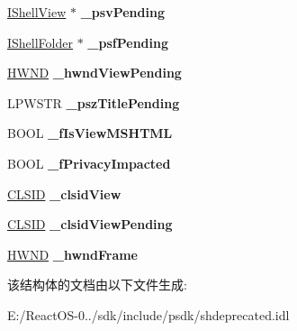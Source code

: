 \begin{DoxyCompactItemize}
\hyperlink{interface_i_shell_view}{I\+Shell\+View} $\ast$ {\bfseries \+\_\+psv\+Pending}
\item 
\mbox{\label{structbasebrowserdataxp_a1b22fd6ab70423c8d0876e6c79c5e8fc}} 
\hyperlink{interface_i_shell_folder}{I\+Shell\+Folder} $\ast$ {\bfseries \+\_\+psf\+Pending}
\item 
\mbox{\label{structbasebrowserdataxp_a0a948ff8259c5c95799078a7fcee6c1a}} 
\hyperlink{interfacevoid}{H\+W\+ND} {\bfseries \+\_\+hwnd\+View\+Pending}
\item 
\mbox{\label{structbasebrowserdataxp_a1cda3a3ee969129390b4b844dac370f8}} 
L\+P\+W\+S\+TR {\bfseries \+\_\+psz\+Title\+Pending}
\item 
\mbox{\label{structbasebrowserdataxp_a46c14f3781d1697c699e15e0bebb848f}} 
B\+O\+OL {\bfseries \+\_\+f\+Is\+View\+M\+S\+H\+T\+ML}
\item 
\mbox{\label{structbasebrowserdataxp_ab3d3a87164307274ec771b13652362d7}} 
B\+O\+OL {\bfseries \+\_\+f\+Privacy\+Impacted}
\item 
\mbox{\label{structbasebrowserdataxp_a1018cd70f852fd6fb305c5b4757632fd}} 
\hyperlink{struct___i_i_d}{C\+L\+S\+ID} {\bfseries \+\_\+clsid\+View}
\item 
\mbox{\label{structbasebrowserdataxp_a4f711e23f70e54b0a0b15348559034e4}} 
\hyperlink{struct___i_i_d}{C\+L\+S\+ID} {\bfseries \+\_\+clsid\+View\+Pending}
\item 
\mbox{\label{structbasebrowserdataxp_a825352d28e1a1092632a18dbeebc53ab}} 
\hyperlink{interfacevoid}{H\+W\+ND} {\bfseries \+\_\+hwnd\+Frame}
\end{DoxyCompactItemize}


该结构体的文档由以下文件生成\+:\begin{DoxyCompactItemize}
\item 
E\+:/\+React\+O\+S-\/0../sdk/include/psdk/shdeprecated.\+idl\end{DoxyCompactItemize}
